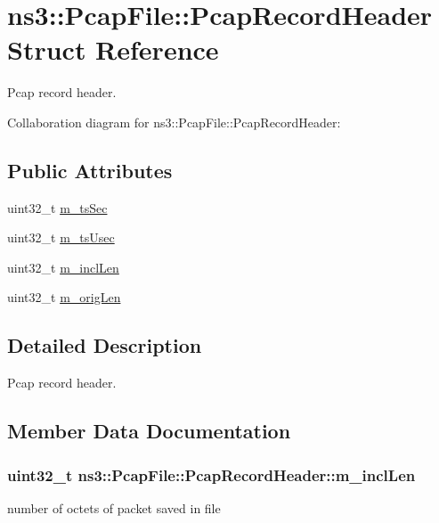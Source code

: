 \hypertarget{structns3_1_1PcapFile_1_1PcapRecordHeader}{}\section{ns3\+:\+:Pcap\+File\+:\+:Pcap\+Record\+Header Struct Reference}
\label{structns3_1_1PcapFile_1_1PcapRecordHeader}


Pcap record header.  




Collaboration diagram for ns3\+:\+:Pcap\+File\+:\+:Pcap\+Record\+Header\+:
\subsection*{Public Attributes}
\begin{DoxyCompactItemize}
\item 
uint32\+\_\+t \hyperlink{structns3_1_1PcapFile_1_1PcapRecordHeader_a47ce88ffb1bcdf9ee9719722399c7170}{m\+\_\+ts\+Sec}
\item 
uint32\+\_\+t \hyperlink{structns3_1_1PcapFile_1_1PcapRecordHeader_a2b3490eacd3021c1a38b81e1c09de9ce}{m\+\_\+ts\+Usec}
\item 
uint32\+\_\+t \hyperlink{structns3_1_1PcapFile_1_1PcapRecordHeader_a0d1015d3d579b99d239af3d0b9ee143a}{m\+\_\+incl\+Len}
\item 
uint32\+\_\+t \hyperlink{structns3_1_1PcapFile_1_1PcapRecordHeader_afc413b89d342ae4c9869084e4f51b3cd}{m\+\_\+orig\+Len}
\end{DoxyCompactItemize}


\subsection{Detailed Description}
Pcap record header. 

\subsection{Member Data Documentation}
\subsubsection[{\texorpdfstring{m\+\_\+incl\+Len}{m_inclLen}}]{\setlength{\rightskip}{0pt plus 5cm}uint32\+\_\+t ns3\+::\+Pcap\+File\+::\+Pcap\+Record\+Header\+::m\+\_\+incl\+Len}\hypertarget{structns3_1_1PcapFile_1_1PcapRecordHeader_a0d1015d3d579b99d239af3d0b9ee143a}{}\label{structns3_1_1PcapFile_1_1PcapRecordHeader_a0d1015d3d579b99d239af3d0b9ee143a}
number of octets of packet saved in file 
